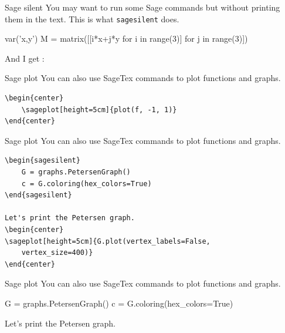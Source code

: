 \documentclass[10pts]{beamer}
\begin{document}
	\begin{frame}[fragile]{Sage silent}
		You may want to run some Sage commands but without printing them in the text. This is what \texttt{sagesilent} does. \newline
		
		\begin{sagesilent}
			var('x,y')
			M = matrix([[i*x+j*y for i in range(3)] for j in range(3)])
		\end{sagesilent}
	
		And I get : \newline
		

	\end{frame}
	\begin{frame}[fragile]{Sage plot}
	You can also use SageTex commands to plot functions and graphs. 
		\begin{Verbatim}[frame=single]
\begin{center}
	\sageplot[height=5cm]{plot(f, -1, 1)}
\end{center}
		\end{Verbatim}
		
		\begin{center}\end{center}
		
	\end{frame}
	\begin{frame}[fragile]{Sage plot}
	You can also use SageTex commands to plot functions and graphs. \newline 
	 
	\begin{Verbatim}[frame=single]
\begin{sagesilent}
	G = graphs.PetersenGraph()
	c = G.coloring(hex_colors=True)
\end{sagesilent}

Let's print the Petersen graph.
\begin{center}
\sageplot[height=5cm]{G.plot(vertex_labels=False, 
	vertex_size=400)}
\end{center}
	\end{Verbatim}	
	\end{frame}
	\begin{frame}[fragile]{Sage plot}
		You can also use SageTex commands to plot functions and graphs. \newline
		
		\begin{sagesilent}
			G = graphs.PetersenGraph()
			c = G.coloring(hex_colors=True)
		\end{sagesilent}

		Let's print the Petersen graph.
		\begin{center}
		\end{center}
	
	\end{frame}
\end{document}
